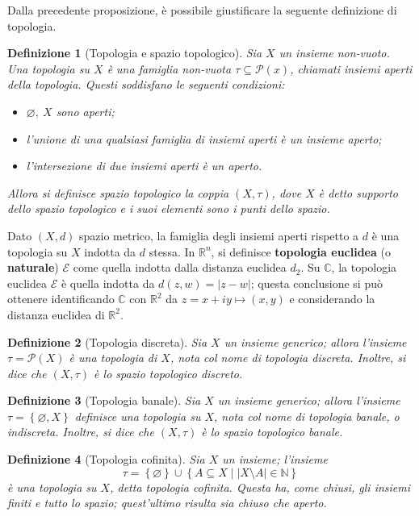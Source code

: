 \documentclass[12pt]{scrartcl}
\theoremstyle{style}
\newtheorem{definizione}{Definizione}[section]
\numberwithin{equation}{subsection}
\renewcommand{\textbf}[1]{\textsf{\bfseries #1}}
\begin{document}
Dalla precedente proposizione, \`e possibile giustificare la seguente definizione di topologia.
\begin{definizione}
	[Topologia e spazio topologico]
	Sia $X$ un insieme non-vuoto. Una \textit{topologia} su $X$ \`e una famiglia non-vuota $\tau \subseteq \mathcal{P} (x)$, chiamati \textit{insiemi aperti della topologia}. Questi soddisfano le seguenti condizioni:
	\begin{itemize}
		\item $\varnothing, \ X$ sono aperti;
		\item l'unione di una qualsiasi famiglia di insiemi aperti \`e un insieme aperto;
		\item l'intersezione di due insiemi aperti \`e un aperto.
	\end{itemize}
	Allora si definisce \textit{spazio topologico} la coppia $(X,\tau )$, dove $X$ \`e detto \textit{supporto} dello spazio topologico e i suoi elementi sono i \textit{punti} dello spazio.
\end{definizione}
\noindent Dato $(X,d)$ spazio metrico, la famiglia degli insiemi aperti rispetto a $d$ \`e una topologia su $X$ indotta da $d$ stessa.
In $\mathbb{R}^n$, si definisce \textbf{topologia euclidea} (o \textbf{naturale}) $\mathcal{E}$ come quella indotta dalla distanza euclidea $d_2$. Su $\mathbb{C}$, la topologia euclidea $\mathcal{E}$ \`e quella indotta da $d(z,w) = \lvert z-w \rvert $; 
questa conclusione si pu\`o ottenere identificando $\mathbb{C}$ con $\mathbb{R}^2$ da $z=x+iy \mapsto (x,y)$ e considerando la distanza euclidea di $\mathbb{R}^2$. 
\begin{definizione}
	[Topologia discreta]
	Sia $X$ un insieme generico; allora l'insieme $\tau  = \mathcal{P} (X)$ \`e una topologia di $X$, nota col nome di \textit{topologia discreta}.
	Inoltre, si dice che $(X,\tau )$ \`e lo \textit{spazio topologico discreto}.
\end{definizione}
\begin{definizione}
	[Topologia banale]
	Sia $X$ un insieme generico; allora l'insieme $\tau  = \left\{ \varnothing, X \right\} $ definisce una topologia su $X$, nota col nome di \textit{topologia banale}, o \textit{indiscreta}.
	Inoltre, si dice che $(X,\tau )$ \`e lo \textit{spazio topologico banale}.
\end{definizione}
\begin{definizione}
	[Topologia cofinita]
	Sia $X$ un insieme; l'insieme 
	\[
	\tau = \left\{ \varnothing \right\} \cup \left\{ A \subseteq X  \mid \lvert X \setminus A \rvert \in \mathbb{N} \right\} 
	\] 
	\`e una topologia su $X$, detta \textit{topologia cofinita}.
	Questa ha, come chiusi, gli insiemi finiti e tutto lo spazio; quest'ultimo risulta sia chiuso che aperto.
\end{definizione}
\end{document}
